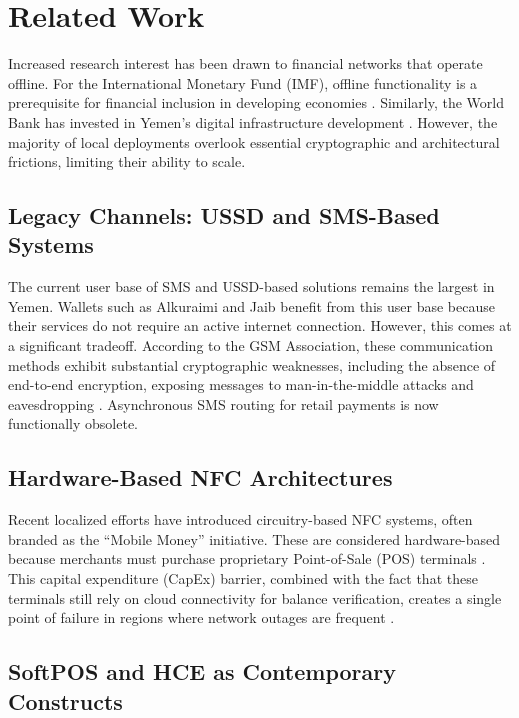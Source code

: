 \documentclass[conference,10pt]{IEEEtran}
\begin{document}
\section{Related Work}

Increased research interest has been drawn to financial networks that operate offline. For the International Monetary Fund (IMF), offline functionality is a prerequisite for financial inclusion in developing economies \cite{imf2022}. Similarly, the World Bank has invested in Yemen's digital infrastructure development \cite{worldbank2023}. However, the majority of local deployments overlook essential cryptographic and architectural frictions, limiting their ability to scale.

\subsection{Legacy Channels: USSD and SMS-Based Systems}

The current user base of SMS and USSD-based solutions remains the largest in Yemen. Wallets such as Alkuraimi and Jaib benefit from this user base because their services do not require an active internet connection. However, this comes at a significant tradeoff. According to the GSM Association, these communication methods exhibit substantial cryptographic weaknesses, including the absence of end-to-end encryption, exposing messages to man-in-the-middle attacks and eavesdropping \cite{gsma2023}. Asynchronous SMS routing for retail payments is now functionally obsolete.

\subsection{Hardware-Based NFC Architectures}

Recent localized efforts have introduced circuitry-based NFC systems, often branded as the ``Mobile Money'' initiative. These are considered hardware-based because merchants must purchase proprietary Point-of-Sale (POS) terminals \cite{brandpos2024}. This capital expenditure (CapEx) barrier, combined with the fact that these terminals still rely on cloud connectivity for balance verification, creates a single point of failure in regions where network outages are frequent \cite{isoc2024}.

\subsection{SoftPOS and HCE as Contemporary Constructs}
\end{document}
